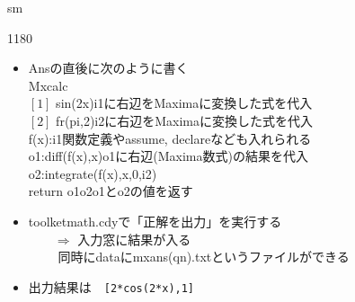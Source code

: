 \documentclass[landscape,10pt]{ujarticle}
\newcommand{\slidepage}[1][s]{%
\setcounter{ketpicctra}{18}%
\if#1m \setcounter{ketpicctra}{1}\fi
\hypersetup{linkcolor=black}%

\begin{layer}{118}{0}
\putnotee{122}{-\theketpicctra.05}{\small\thepage/\pageref{pageend}}
\end{layer}\hypersetup{linkcolor=blue}

}
\begin{document}


\vspace*{18mm}

\slidepage
\begin{itemize}
\item
Ansの直後に次のように書く\\
Mxcalc\\
$[1]$ sin(2x)\hfill{\color{red}i1に右辺をMaximaに変換した式を代入}\\
$[2]$ fr(pi,2)\hfill{\color{red}i2に右辺をMaximaに変換した式を代入}\\
f(x):i1\hfill{\color{red}関数定義やassume, declareなども入れられる}\\
o1:diff(f(x),x)\hfill{\color{red}o1に右辺(Maxima数式)の結果を代入}\\
o2:integrate(f(x),x,0,i2)\\
return o1\dc o2\hfill{\color{red}o1とo2の値を返す}
\item
toolketmath.cdyで「正解を出力」を実行する\\
　　$\Longrightarrow$ 入力窓に結果が入る\\
　　\phantom{$\Longrightarrow$} 同時にdataにmxans(qn).txtというファイルができる
\item
出力結果は　\verb|[2*cos(2*x),1]|
\end{itemize}
\label{pageend}\mbox{}
\end{document}
